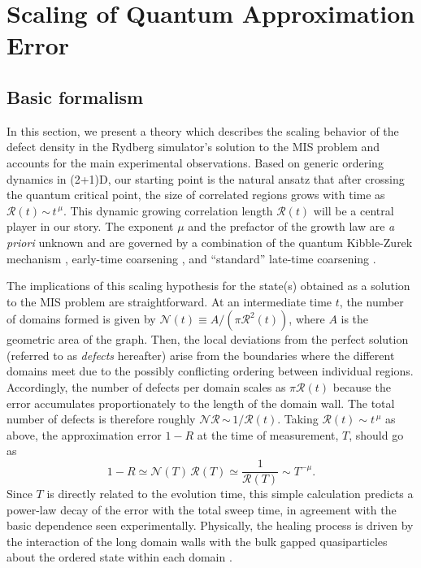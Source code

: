 \documentclass[twocolumn,amssymb,secnumarabic, prl, aps, nofootinbib]{revtex4-1}
\newcommand{\mc}{\mathcal}
\begin{document}
\section{Scaling of Quantum Approximation Error \label{Sec:coarsening}}


\subsection{Basic formalism}

In this section, we present a theory which describes the scaling behavior of the defect density in the Rydberg simulator's solution to the MIS problem and accounts for the main experimental observations. Based on generic ordering dynamics in (2+1)D, our starting point is the natural ansatz that after crossing the quantum critical point, the size of correlated regions grows with time as $\mc{R}(t)$\,$\sim$\,$t^{\,\mu}$. This dynamic growing correlation length $\mc{R}(t)$ will be a central player in our story. The exponent $\mu$ and the prefactor of the growth law are \textit{a priori} unknown and are governed by a combination of the quantum Kibble-Zurek mechanism \cite{zurek_dynamics_2005, PhysRevB.72.161201}, early-time coarsening \cite{PhysRevX.5.021015}, and ``standard'' late-time coarsening \cite{biroli2010kibble}.



The implications of this scaling hypothesis for the state(s) obtained as a solution to the MIS problem are straightforward. At an intermediate time $t$, the number of domains formed is given by $\mc{N}(t) \equiv A/(\pi \mc{R}^2(t))$, where $A$ is the geometric area of the graph. Then, the local deviations from the perfect solution (referred to as \textsl{defects} hereafter) arise from the boundaries where the different domains meet due to the possibly conflicting ordering between individual regions. Accordingly, the number of defects per domain scales as $\pi \mc{R}(t)$ because the error accumulates proportionately to the length of the domain wall. The total number of defects is therefore roughly $\mc{N} \mc{R}$\,$\sim$\,$1/\mc{R}(t)$. Taking $\mc{R}(t) \sim t^{\,\mu}$ as above, the approximation error $1 -R$ at the time of measurement, $T$, should go as \begin{equation}
	1-R \simeq \mc{N} (T)\, \mc{R}(T) \simeq \frac{1}{\mc{R}(T)} \sim T^{-\mu}.
\end{equation} 
Since $T$ is directly related to the evolution time, this simple calculation predicts a power-law decay of the error with the total sweep time, in agreement with the basic dependence seen experimentally. Physically, the healing process is driven by the interaction of the long domain walls with the bulk gapped quasiparticles about the ordered state within each domain \cite{chandran2013kibble}.
\end{document}
